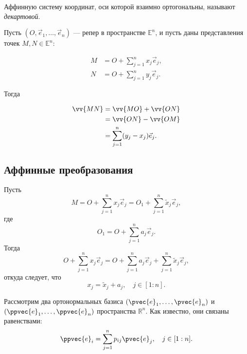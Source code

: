 \begin{definition}
  Аффинную систему координат, оси которой взаимно ортогональны, называют
  \textit{декартовой}.
\end{definition}

Пусть $(O, \vec{e}_1, \dots, \vec{e}_n)$ --- репер в пространстве
$\mathbb{E}^n$, и пусть даны представления точек $M,N \in \mathbb{E}^n$:

\begin{equation}
  \begin{aligned}
    M &= O + \sum_{j=1}^n x_j \vec{e}_j, \\
    N &= O + \sum_{j=1}^n y_j \vec{e}_j.
  \end{aligned}
\end{equation}

Тогда

\begin{equation}
  \begin{aligned}
    \vv{MN} &= \vv{MO} + \vv{ON} \\
    &= \vv{ON} - \vv{OM} \\
    &= \sum_{j=1}^n (y_j - x_j) \vec{e}_j.
  \end{aligned}
\end{equation}

\subsection{Аффинные преобразования}

Пусть
\begin{equation}
  M = O + \sum_{j=1}^n x_j \vec{e}_j = O_1 + \sum_{j=1}^n \tilde{x}_j \vec{e}_j,
\end{equation}
где
\begin{equation}
  O_1 = O + \sum_{j=1}^n a_j \vec{e}_j.
\end{equation}
Тогда
\begin{equation*}
  O + \sum_{j=1}^n x_j \vec{e}_j = O + \sum_{j=1}^n a_j \vec{e}_j +
    \sum_{j=1}^n \tilde{x}_j \vec{e}_j,
\end{equation*}
откуда следует, что
\begin{equation}
  x_j = \tilde{x}_j + a_j, \quad j \in [1:n].
\end{equation}

Рассмотрим два ортонормальных базиса $(\pvec{e}_1, \dots, \pvec{e}_n)$ и
$(\ppvec{e}_1, \dots,  \ppvec{e}_n)$ пространства $\mathbb{R}^n$. Как
известно, они связаны равенствами:
\begin{equation}
  \label{eq:basis_transform}
  \ppvec{e}_i = \sum_{j=1}^n p_{ij} \pvec{e}_j, \quad j \in [1:n].
\end{equation}

